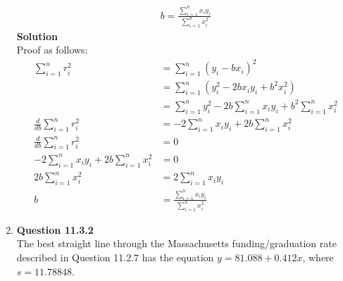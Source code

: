 \documentclass{uofa-eng-assignment}
\begin{document}
\begin{enumerate}
\begin{align*}
            b = \frac{\sum_{i=1}^{n}x_iy_i}{\sum_{i=1}^{n}x_i^2}
        \end{align*}
        \textbf{Solution} \\
        Proof as follows:
        \begin{align*}
            \sum_{i=1}^{n}r_i^2                            & = \sum_{i=1}^{n}(y_i - bx_i)^2                                          \\
                                                           & = \sum_{i=1}^{n}(y_i^2 - 2bx_iy_i + b^2x_i^2)                           \\
                                                           & = \sum_{i=1}^{n}y_i^2 - 2b\sum_{i=1}^{n}x_iy_i + b^2\sum_{i=1}^{n}x_i^2 \\
            \frac{d}{db}\sum_{i=1}^{n}r_i^2                & = -2\sum_{i=1}^{n}x_iy_i + 2b\sum_{i=1}^{n}x_i^2                        \\
            \frac{d}{db}\sum_{i=1}^{n}r_i^2                & = 0                                                                     \\
            -2\sum_{i=1}^{n}x_iy_i + 2b\sum_{i=1}^{n}x_i^2 & = 0                                                                     \\
            2b\sum_{i=1}^{n}x_i^2                          & = 2\sum_{i=1}^{n}x_iy_i                                                 \\
            b                                              & = \frac{\sum_{i=1}^{n}x_iy_i}{\sum_{i=1}^{n}x_i^2}
        \end{align*}
    \item[]
        \textbf{Question 11.3.2} \\
        The best straight line through the Massachusetts funding/graduation rate described in Question 11.2.7
        has the equation $y = 81.088 + 0.412x$, where $s = 11.78848$.
        \begin{itemize}

\end{itemize}
\end{enumerate}
\end{document}
